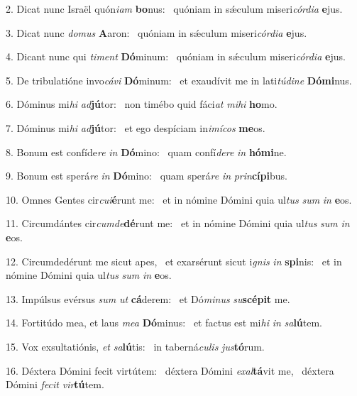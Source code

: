 2. Dicat nunc Israël quón\textit{i}\textit{am} \textbf{bo}nus: \ast\  quóniam in sǽculum miseri\textit{cór}\textit{di}\textit{a} \textbf{e}jus.\

3. Dicat nunc \textit{do}\textit{mus} \textbf{A}aron: \ast\  quóniam in sǽculum miseri\textit{cór}\textit{di}\textit{a} \textbf{e}jus.\

4. Dicant nunc qui \textit{ti}\textit{ment} \textbf{Dó}minum: \ast\  quóniam in sǽculum miseri\textit{cór}\textit{di}\textit{a} \textbf{e}jus.\

5. De tribulatióne invo\textit{cá}\textit{vi} \textbf{Dó}minum: \ast\  et exaudívit me in lati\textit{tú}\textit{di}\textit{ne} \textbf{Dó}\textbf{mi}nus.\

6. Dóminus mi\textit{hi} \textit{ad}\textbf{jú}tor: \ast\  non timébo quid fáci\textit{at} \textit{mi}\textit{hi} \textbf{ho}mo.\

7. Dóminus mi\textit{hi} \textit{ad}\textbf{jú}tor: \ast\  et ego despíciam in\textit{i}\textit{mí}\textit{cos} \textbf{me}os.\

8. Bonum est confíde\textit{re} \textit{in} \textbf{Dó}mino: \ast\  quam confí\textit{de}\textit{re} \textit{in} \textbf{hó}\textbf{mi}ne.\

9. Bonum est sperá\textit{re} \textit{in} \textbf{Dó}mino: \ast\  quam sperá\textit{re} \textit{in} \textit{prin}\textbf{cí}\textbf{pi}bus.\

10. Omnes Gentes cir\textit{cu}\textit{i}\textbf{é}runt me: \ast\  et in nómine Dómini quia ul\textit{tus} \textit{sum} \textit{in} \textbf{e}os.\

11. Circumdántes cir\textit{cum}\textit{de}\textbf{dé}runt me: \ast\  et in nómine Dómini quia ul\textit{tus} \textit{sum} \textit{in} \textbf{e}os.\

12. Circumdedérunt me sicut apes, \dag\  et exarsérunt sicut i\textit{gnis} \textit{in} \textbf{spi}nis: \ast\  et in nómine Dómini quia ul\textit{tus} \textit{sum} \textit{in} \textbf{e}os.\

13. Impúlsus evérsus \textit{sum} \textit{ut} \textbf{cá}derem: \ast\  et Dó\textit{mi}\textit{nus} \textit{su}\textbf{scé}\textbf{pit} me.\

14. Fortitúdo mea, et laus \textit{me}\textit{a} \textbf{Dó}minus: \ast\  et factus est mi\textit{hi} \textit{in} \textit{sa}\textbf{lú}tem.\

15. Vox exsultatiónis, \textit{et} \textit{sa}\textbf{lú}tis: \ast\  in taberná\textit{cu}\textit{lis} \textit{jus}\textbf{tó}rum.\

16. Déxtera Dómini fecit virtútem: \dag\  déxtera Dómini \textit{ex}\textit{al}\textbf{tá}vit me, \ast\  déxtera Dómini \textit{fe}\textit{cit} \textit{vir}\textbf{tú}tem.\

